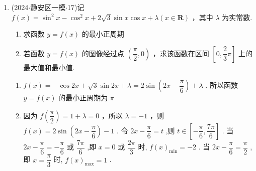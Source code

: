 \begin{enumerate}
    \item (2024$\cdot$静安区一模$\cdot$17)记 $f\left( x\right)  = {\sin }^{2}x - {\cos }^{2}x + 2\sqrt{3}\sin x\cos x + \lambda \left( {x \in  \mathbf{R}}\right)$ ，其中 $\lambda$ 为实常数.
    \begin{enumerate}
        \item 求函数 $y = f\left( x\right)$ 的最小正周期
        \item 若函数 $y = f\left( x\right)$ 的图像经过点 $\left( {\dfrac{\pi }{2},0}\right)$ ，求该函数在区间 $\left\lbrack  {0,\dfrac{2}{3}\pi }\right\rbrack$ 上的最大值和最小值.
    \end{enumerate}
    \begin{jieda}
        \begin{enumerate}
            \item $f\left( x\right)  =  - \cos {2x} + \sqrt{3}\sin {2x} + \lambda  = 2\sin \left( {{2x} - \dfrac{\pi }{6}}\right)  +  \lambda$ . 所以函数 $y = f\left( x\right)$ 的最小正周期为 $\pi$
            
            \item 因为 $f\left( \dfrac{\pi }{2}\right)  = 1 + \lambda  = 0$ ，所以 $\lambda  =  - 1$ ，则 $f\left( x\right)  =  2\sin \left( {{2x} - \dfrac{\pi }{6}}\right)  - 1$ . 令 ${2x} - \dfrac{\pi }{6} = t$ ,则 $t \in  \left\lbrack  {-\dfrac{\pi }{6},\dfrac{7\pi }{6}}\right\rbrack$ . 当 ${2x} - \dfrac{\pi }{6} =  - \dfrac{\pi }{6}$ 或 $\dfrac{7\pi }{6}$ ,即 $x = 0$ 或 $\dfrac{2\pi }{3}$ 时, $f{\left( x\right) }_{\min } =  - 2$ . 当 ${2x} - \dfrac{\pi }{6} = \dfrac{\pi }{2}$ ,即 $x = \dfrac{\pi }{3}$ 时, $f{\left( x\right) }_{\max } = 1$ .
        \end{enumerate}
    \end{jieda}


\end{enumerate}

